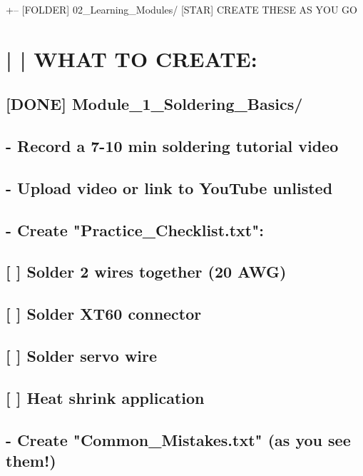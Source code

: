 \documentclass[11pt,letterpaper]{article}
\begin{document}
+-- [FOLDER] 02\_Learning\_Modules/  [STAR] CREATE THESE AS YOU GO\par

\section{|   |   WHAT TO CREATE:}

\subsection*{[DONE] Module\_1\_Soldering\_Basics/}

\subsection*{- Record a 7-10 min soldering tutorial video}

\subsection*{- Upload video or link to YouTube unlisted}

\subsection*{- Create "Practice\_Checklist.txt":}

\subsection*{[ ] Solder 2 wires together (20 AWG)}

\subsection*{[ ] Solder XT60 connector}

\subsection*{[ ] Solder servo wire}

\subsection*{[ ] Heat shrink application}

\subsection*{- Create "Common\_Mistakes.txt" (as you see them!)}
\end{document}
